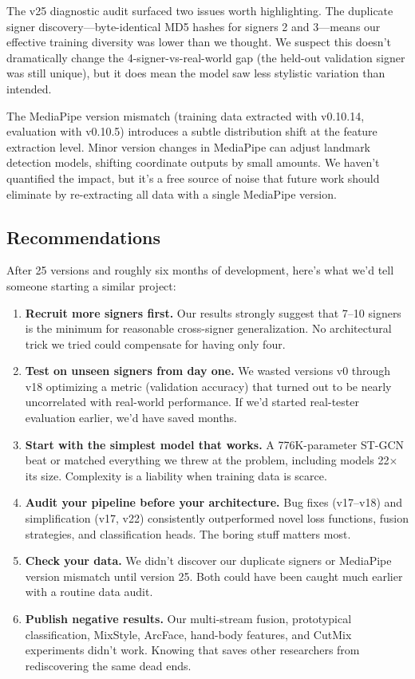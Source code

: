 \documentclass[conference]{IEEEtran}
\begin{document}
The v25 diagnostic audit surfaced two issues worth highlighting. The duplicate signer discovery---byte-identical MD5 hashes for signers 2 and 3---means our effective training diversity was lower than we thought. We suspect this doesn't dramatically change the 4-signer-vs-real-world gap (the held-out validation signer was still unique), but it does mean the model saw less stylistic variation than intended.

The MediaPipe version mismatch (training data extracted with v0.10.14, evaluation with v0.10.5) introduces a subtle distribution shift at the feature extraction level. Minor version changes in MediaPipe can adjust landmark detection models, shifting coordinate outputs by small amounts. We haven't quantified the impact, but it's a free source of noise that future work should eliminate by re-extracting all data with a single MediaPipe version.

\subsection{Recommendations}

After 25 versions and roughly six months of development, here's what we'd tell someone starting a similar project:

\begin{enumerate}
    \item \textbf{Recruit more signers first.} Our results strongly suggest that 7--10 signers is the minimum for reasonable cross-signer generalization. No architectural trick we tried could compensate for having only four.
    \item \textbf{Test on unseen signers from day one.} We wasted versions v0 through v18 optimizing a metric (validation accuracy) that turned out to be nearly uncorrelated with real-world performance. If we'd started real-tester evaluation earlier, we'd have saved months.
    \item \textbf{Start with the simplest model that works.} A 776K-parameter ST-GCN beat or matched everything we threw at the problem, including models 22$\times$ its size. Complexity is a liability when training data is scarce.
    \item \textbf{Audit your pipeline before your architecture.} Bug fixes (v17--v18) and simplification (v17, v22) consistently outperformed novel loss functions, fusion strategies, and classification heads. The boring stuff matters most.
    \item \textbf{Check your data.} We didn't discover our duplicate signers or MediaPipe version mismatch until version 25. Both could have been caught much earlier with a routine data audit.
    \item \textbf{Publish negative results.} Our multi-stream fusion, prototypical classification, MixStyle, ArcFace, hand-body features, and CutMix experiments didn't work. Knowing that saves other researchers from rediscovering the same dead ends.
\end{enumerate}
\end{document}
